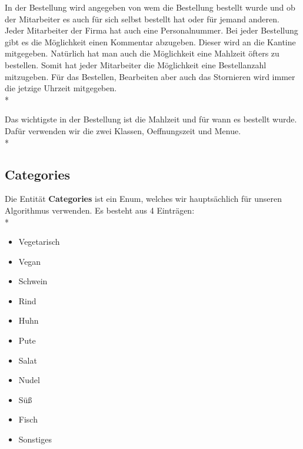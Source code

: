 In der Bestellung wird angegeben von wem die Bestellung bestellt wurde und ob der Mitarbeiter es auch für sich selbst bestellt hat oder für jemand anderen. 
Jeder Mitarbeiter der Firma hat auch eine Personalnummer. Bei jeder Bestellung gibt es die Möglichkeit einen Kommentar abzugeben. Dieser wird an die Kantine mitgegeben. Natürlich hat man auch die Möglichkeit 
eine Mahlzeit öfters zu bestellen. Somit hat jeder Mitarbeiter die Möglichkeit eine Bestellanzahl mitzugeben. Für das Bestellen, Bearbeiten aber auch das Stornieren wird immer die jetzige Uhrzeit mitgegeben. \\*

Das wichtigste in der Bestellung ist die Mahlzeit und für wann es bestellt wurde. Dafür verwenden wir die zwei Klassen, Oeffnungszeit und Menue. \\*




\subsection{Categories}

Die Entität \textbf{Categories} ist ein Enum, welches wir hauptsächlich für unseren Algorithmus verwenden. Es besteht aus 4 Einträgen: \\*


\begin{itemize}
    \item Vegetarisch
    \item Vegan
    \item Schwein
    \item Rind
    \item Huhn
    \item Pute
    \item Salat
    \item Nudel
    \item Süß
    \item Fisch
    \item Sonstiges
\end{itemize}

